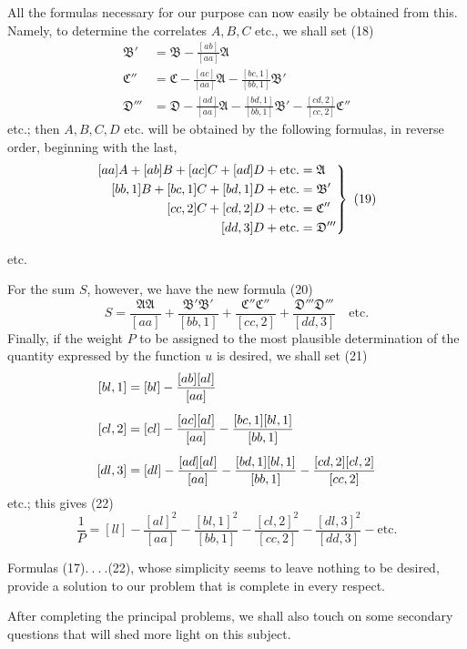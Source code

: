 All the formulas necessary for our purpose can now easily be obtained from this. Namely, to determine the correlates \(A,B,C\) etc., we shall set (18)
\[
\begin{aligned}
\mathfrak B'&=\mathfrak B-\frac{[ab]}{[aa]}\mathfrak A\\[5pt]
\mathfrak C''&=\mathfrak C-\frac{[ac]}{[aa]}\mathfrak A-\frac{[bc,1]}{[bb,1]}\mathfrak B'\\[5pt]
\mathfrak D'''&=\mathfrak D-\frac{[ad]}{[aa]}\mathfrak A-\frac{[bd,1]}{[bb,1]}\mathfrak B'-\frac{[cd,2]}{[cc,2]}\mathfrak C''
\end{aligned}
\]
etc.; then \(A,B,C,D\) etc. will be obtained by the following formulas, in reverse order, beginning with the last,
\[
\left.\begin{aligned}\relax
[aa]A+[ab]B+[ac]C+[ad]D+\text{etc.}&=\mathfrak A\\
[bb,1]B+[bc,1]C+[bd,1]D+\text{etc.}&=\mathfrak B'\\
[cc,2]C+[cd,2]D+\text{etc.}&=\mathfrak C''\\
[dd,3]D+\text{etc.}&=\mathfrak D'''
\end{aligned}\right\}\ (19)
\]
\begin{center}etc.\end{center}
For the sum \(S\), however, we have the new formula (20)
\[
S=\frac{\mathfrak A\mathfrak A}{[aa]}+\frac{\mathfrak B'\mathfrak B'}{[bb,1]}+\frac{\mathfrak C''\mathfrak C''}{[cc,2]}+\frac{\mathfrak D'''\mathfrak D'''}{[dd,3]}\quad\text{etc.}
\]
Finally, if the weight \(P\) to be assigned to the most plausible determination of the quantity expressed by the function \(u\) is desired, we shall set (21)
\[
\begin{aligned}\relax
[bl,1]&=[bl]-\frac{[ab][al]}{[aa]}\\[5pt]
[cl,2]&=[cl]-\frac{[ac][al]}{[aa]}-\frac{[bc,1][bl,1]}{[bb,1]}\\[5pt]
[dl,3]&=[dl]-\frac{[ad][al]}{[aa]}-\frac{[bd,1][bl,1]}{[bb,1]}-\frac{[cd,2][cl,2]}{[cc,2]}
\end{aligned}
\]
etc.; this gives (22)
\[
\frac1P=[ll]-\frac{[al]^2}{[aa]}-\frac{[bl,1]^2}{[bb,1]}-\frac{[cl,2]^2}{[cc,2]}-\frac{[dl,3]^2}{[dd,3]}-\text{etc.}
\]

Formulas (17)\(.\ .\ .\ .\)(22), whose simplicity seems to leave nothing to be desired, provide a solution to our problem that is complete in every respect.

After completing the principal problems, we shall also touch on some secondary questions that will shed more light on this subject.

